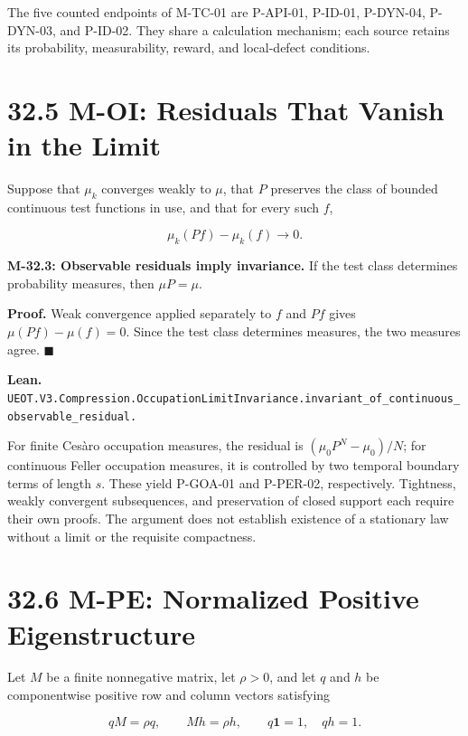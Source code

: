 \documentclass[
  english,
  11pt,
  oneside]{book}
\begin{document}
The five counted endpoints of M-TC-01 are P-API-01, P-ID-01, P-DYN-04, P-DYN-03, and P-ID-02. They share a calculation mechanism; each source retains its probability, measurability, reward, and local-defect conditions.

\section{32.5 M-OI: Residuals That Vanish in the Limit}\label{m-oi-residuals-that-vanish-in-the-limit}

Suppose that \(\mu_k\) converges weakly to \(\mu\), that \(P\) preserves the class of bounded continuous test functions in use, and that for every such \(f\),

\[\mu_k(Pf)-\mu_k(f)\longrightarrow0.\]

\hypertarget{m-32-3}{}\label{m-32-3}

\textbf{M-32.3: Observable residuals imply invariance.} If the test class determines probability measures, then \(\mu P=\mu\).

\textbf{Proof.} Weak convergence applied separately to \(f\) and \(Pf\) gives \(\mu(Pf)-\mu(f)=0\). Since the test class determines measures, the two measures agree. \(\blacksquare\)

\textbf{Lean.} \nolinkurl{UEOT.V3.Compression.OccupationLimitInvariance.invariant_of_continuous_observable_residual.}

For finite Cesàro occupation measures, the residual is \((\mu_0P^N-\mu_0)/N\); for continuous Feller occupation measures, it is controlled by two temporal boundary terms of length \(s\). These yield P-GOA-01 and P-PER-02, respectively. Tightness, weakly convergent subsequences, and preservation of closed support each require their own proofs. The argument does not establish existence of a stationary law without a limit or the requisite compactness.

\section{32.6 M-PE: Normalized Positive Eigenstructure}\label{m-pe-normalized-positive-eigenstructure}

Let \(M\) be a finite nonnegative matrix, let \(\rho>0\), and let \(q\) and \(h\) be componentwise positive row and column vectors satisfying

\[qM=\rho q,\qquad Mh=\rho h,\qquad q\mathbf1=1,\quad qh=1.\]

\hypertarget{m-32-4}{}\label{m-32-4}
\end{document}
